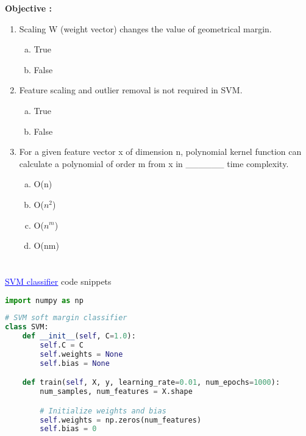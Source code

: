 \documentclass[12pt,a4paper]{article}
\begin{document}
{\textbf{Objective : }
\begin{enumerate}[1)]
    \item Scaling W (weight vector) changes the value of geometrical margin.
    \begin{enumerate}[a)]
        \item True
        \item False
    \end{enumerate} 
     \item Feature scaling and outlier removal is not required in SVM.
    \begin{enumerate}[a)]
        \item True
        \item False
    \end{enumerate} 
    \item For a given feature vector x of dimension n, polynomial kernel
function can calculate a polynomial of order m from x in \_\_\_\_\_\_ time
complexity.
    \begin{enumerate}[a)]
        \item  O(n)
        \item O($n^2$)
        \item O($n^m$)
        \item O(nm)
    \end{enumerate}
\end{enumerate}



\section{}
 \href{https://github.com/IITH-Epoch/Handouts-2022-2023/blob/main/SVM/SVM.ipynb}{\textcolor{blue}{\underline{SVM classifier}}} code snippets 

\begin{lstlisting}[language=python, style = mystyle]
	  import numpy as np
\end{lstlisting}
\begin{lstlisting}[language=python, style = mystyle]
    # SVM soft margin classifier
class SVM:
    def __init__(self, C=1.0):
        self.C = C
        self.weights = None
        self.bias = None

    def train(self, X, y, learning_rate=0.01, num_epochs=1000):
        num_samples, num_features = X.shape

        # Initialize weights and bias
        self.weights = np.zeros(num_features)
        self.bias = 0


\end{lstlisting}}
\end{document}
